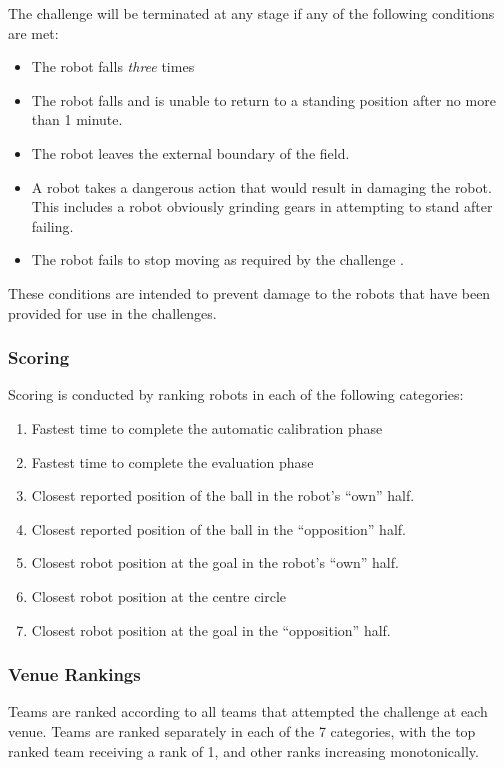 The challenge will be terminated at any stage if any of the following conditions are met:
\begin{itemize}
    \item The robot falls \textit{three} times
    \item The robot falls and is unable to return to a standing position after no more than 1 minute.
    \item The robot leaves the external boundary of the field.
    \item A robot takes a dangerous action that would result in damaging the robot. This includes a robot obviously grinding gears in attempting to stand after failing.
    \item The robot fails to stop moving as required by the challenge .
\end{itemize}

These conditions are intended to prevent damage to the robots that have been provided for use in the challenges.

\subsubsection{Scoring}

Scoring is conducted by ranking robots in each of the following categories:
\begin{enumerate}
    \item Fastest time to complete the automatic calibration phase
    \item Fastest time to complete the evaluation phase
    \item Closest reported position of the ball in the robot's ``own'' half.
    \item Closest reported position of the ball in the ``opposition'' half.
    \item Closest robot position at the goal in the robot's ``own'' half.
    \item Closest robot position at the centre circle
    \item Closest robot position at the goal in the ``opposition'' half.
\end{enumerate} 

\subsubsection{Venue Rankings}
Teams are ranked according to all teams that attempted the challenge at each venue. Teams are ranked separately in each of the 7 categories, with the top ranked team receiving a rank of 1, and other ranks increasing monotonically.

